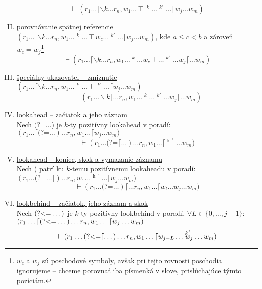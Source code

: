 \documentclass{svk_long_sk}
\def\lookahead{\text{(?=}}
\def\lookbehind{\text{(?\textless =}}
\begin{document}
\begin{definition}
\begin{enumerate}[I.]
$$\vdash(r_1 \dots \lceil \backslash k \dots r_n,w_1\ldots\intercal\mathop{w_a}^k \dots \mathop{w_b}^{k'} \dots \lceil w_j\dots w_m)$$	
\item \underline{porovnávanie spätnej referencie}
\\ $\displaystyle{(r_1 \dots \lceil \backslash k \dots r_n,w_1\dots\mathop{w_a}^k\ldots \intercal w_c \dots \mathop{w_b}^{k'} \dots \lceil w_j\dots w_m)}$, kde $a\leq c < b$ a zároveň $w_c = w_j$\footnote{$w_c$ a $w_j$ sú poschodové symboly, avšak pri tejto rovnosti poschodia ignorujeme -- chceme porovnať iba písmenká v slove, prislúchajúce týmto pozíciám.}
$$\vdash(r_1 \dots \lceil \backslash k \dots r_n,w_1\dots\mathop{w_a}^k\dots w_c\intercal \dots \mathop{w_b}^{k'} \dots  w_j\lceil\dots w_m)$$
\item \underline{špeciálny ukazovateľ -- zmiznutie}
\\ $\displaystyle{(r_1 \dots \lceil \backslash k \dots r_n,w_1\dots\mathop{w_a}^k\ldots \intercal  \mathop{w_b}^{k'} \dots \lceil w_j\dots w_m)}$
$$\vdash(r_1 \dots  \backslash k \lceil \dots r_n,w_1\dots\mathop{w_a}^k\dots \mathop{w_b}^{k'} \dots  w_j\lceil\dots w_m)$$
\item \underline{lookahead -- začiatok a jeho záznam} 
\\ Nech $\lookahead \dots$) je $k$-ty pozitívny lookahead v poradí: 
\\ $\displaystyle{(r_1\dots \lceil \lookahead \dots) \dots r_n, w_1\dots\lceil w_j\dots w_m )}$
$$ \vdash(r_1\dots \lookahead\lceil\dots) \dots r_n, w_1\dots\lceil \mathop{w_j}^{\mathop{k}^\rightarrow}\dots w_m ) $$
\item \underline{lookahead -- koniec, skok a vymazanie záznamu}
\\ Nech ) patrí ku $k$-temu pozitívnemu lookaheadu v poradí: 
\\ $\displaystyle{(r_1\dots \lookahead\dots\lceil) \dots r_n, w_1\dots \mathop{w_l}^{\mathop{k}^\rightarrow}\dots\lceil w_j\dots w_m )} $
$$ \vdash(r_1\dots \lookahead\dots)\lceil \dots r_n, w_1\dots \lceil w_l \dots w_j\dots w_m ) $$
\item \underline{lookbehind -- začiatok, jeho záznam a skok}
\\ Nech $\lookbehind\dots)$ je $k$-ty pozitívny lookbehind v poradí, $\forall L\in\lbrace 0,\dots, j-1\rbrace$:
\\ $\displaystyle{(r_1\dots \lceil \lookbehind\dots) \dots r_n, w_1\dots\lceil w_j\dots w_m )}$
$$ \vdash (r_1\dots \lookbehind\lceil\dots) \dots r_n, w_1\dots\lceil w_{j-L}\dots \mathop{w_j}^{\mathop{k}^\leftarrow} \dots w_m ) $$

\end{enumerate}
\end{definition}
\end{document}
